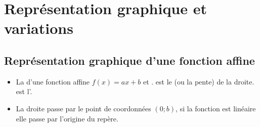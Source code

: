 \documentclass[xcolor={dvipsnames}]{beamer}
\begin{document}
\section{Représentation graphique et variations}

\subsection{Représentation graphique d'une fonction affine}	

\begin{frame}
	\begin{myprops}
		\begin{itemize}
			\item La  d'une fonction affine $f(x)=ax+b$ et . 
			 est le  (ou la pente) de la droite.
			 est l'.
			\item La droite passe par le point de coordonnées $(0;b)$, si la fonction est linéaire elle passe par l'origine du repère.
		\end{itemize}
	
	\end{myprops}
\end{frame}
\end{document}
